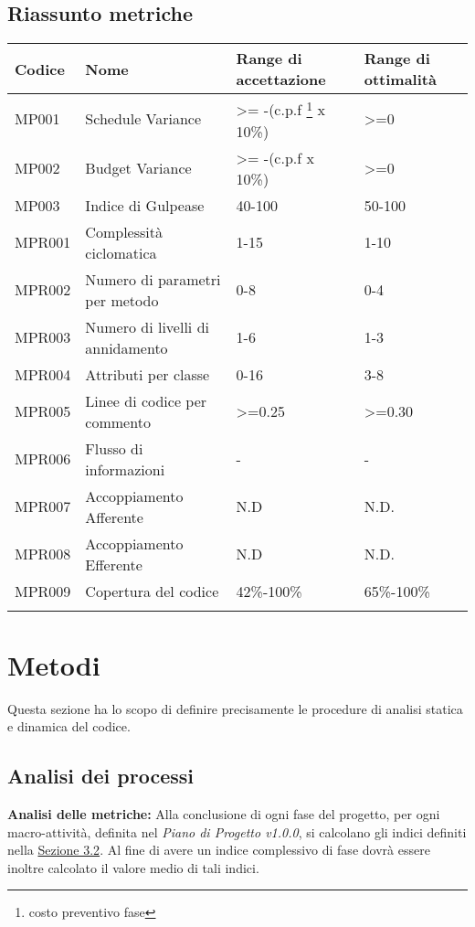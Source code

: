 \subsection{Riassunto metriche}
\begin{center}
\begin{tabularx}{\textwidth}{|X|X|X|X|}

	\hline
	\textbf{Codice} & \textbf{Nome} & 	\textbf{Range di accettazione} & \textbf{Range di ottimalità}\\
	\endhead
	\hline
	MP001 & Schedule Variance& >= -(c.p.f \footnote{costo preventivo fase} x 10\%)& >=0  \\
	\hline
	MP002 & Budget Variance & >= -(c.p.f x 10\%)& >=0 \\
	\hline
	MP003 & Indice di Gulpease & 40-100 & 50-100\\
	\hline
	MPR001 & Complessità ciclomatica & 1-15 & 1-10 \\
	\hline
	MPR002 & Numero di parametri per metodo & 0-8 & 0-4 \\
	\hline
	MPR003 & Numero di livelli di annidamento & 1-6 & 1-3 \\
	\hline
	MPR004 & Attributi per classe & 0-16 & 3-8 \\
	\hline
	MPR005 & Linee di codice per commento & >=0.25 & >=0.30 \\
	\hline
	MPR006 & Flusso di informazioni & - & - \\
	\hline
	MPR007 & Accoppiamento Afferente & N.D & N.D. \\
	\hline
	MPR008 & Accoppiamento Efferente& N.D & N.D. \\
	\hline
	MPR009 & Copertura del codice & 42\%-100\% & 65\%-100\% \\
	\hline
	\caption{Tabella delle metriche}
\end{tabularx}
\end{center}

\section{Metodi}\label{Metodi}
Questa sezione ha lo scopo di definire precisamente le procedure di analisi statica e dinamica del codice.
\subsection{Analisi dei processi}
	 \textbf{Analisi delle metriche:} Alla conclusione di ogni fase del progetto, per ogni macro-attività, definita nel
	\textit{Piano di Progetto v1.0.0}, si calcolano gli indici definiti nella \hyperref[Metriche]{Sezione 3.2}. Al fine
	di avere un indice complessivo di fase dovrà essere inoltre calcolato il valore medio
	di tali indici.
